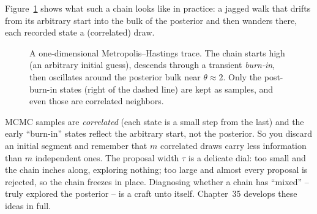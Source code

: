 Figure~\ref{ch34:fig-mcmc} shows what such a chain looks like in practice: a
jagged walk that drifts from its arbitrary start into the bulk of the posterior
and then wanders there, each recorded state a (correlated) draw.

\begin{figure}[H]
\centering
{}
\caption{A one-dimensional Metropolis--Hastings trace. The chain starts high
(an arbitrary initial guess), descends through a transient \emph{burn-in}, then
oscillates around the posterior bulk near $\theta\approx 2$. Only the
post-burn-in states (right of the dashed line) are kept as samples, and even
those are correlated neighbors.}
\label{ch34:fig-mcmc}
\end{figure}

\begin{trapbox}
MCMC samples are \emph{correlated} (each state is a small step from the last) and
the early ``burn-in'' states reflect the arbitrary start, not the posterior. So
you discard an initial segment and remember that $m$ correlated draws carry less
information than $m$ independent ones. The proposal width $\tau$ is a delicate
dial: too small and the chain inches along, exploring nothing; too large and
almost every proposal is rejected, so the chain freezes in place. Diagnosing
whether a chain has ``mixed'' -- truly explored the posterior -- is a craft unto
itself. Chapter~35 develops these ideas in full.
\end{trapbox}

